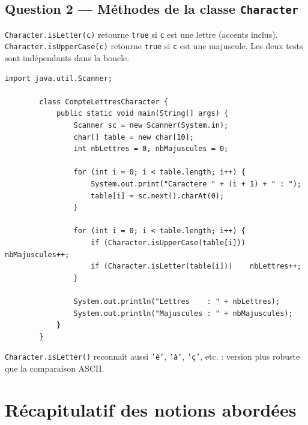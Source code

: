 \documentclass[12pt,a4paper]{article}
\begin{document}
	\subsection*{Question 2 — Méthodes de la classe \texttt{Character}}
	
	\begin{boiteRaisonnement}
		\texttt{Character.isLetter(c)} retourne \texttt{true} si \texttt{c} est une lettre
		(accents inclus). \texttt{Character.isUpperCase(c)} retourne \texttt{true} si
		\texttt{c} est une majuscule. Les deux tests sont indépendants dans la boucle.
	\end{boiteRaisonnement}
	
	\begin{lstlisting}[style=java, caption={Q2 — Comptage avec Character}]
		import java.util.Scanner;
		
		class CompteLettresCharacter {
			public static void main(String[] args) {
				Scanner sc = new Scanner(System.in);
				char[] table = new char[10];
				int nbLettres = 0, nbMajuscules = 0;
				
				for (int i = 0; i < table.length; i++) {
					System.out.print("Caractere " + (i + 1) + " : ");
					table[i] = sc.next().charAt(0);
				}
				
				for (int i = 0; i < table.length; i++) {
					if (Character.isUpperCase(table[i])) nbMajuscules++;
					if (Character.isLetter(table[i]))    nbLettres++;
				}
				
				System.out.println("Lettres    : " + nbLettres);
				System.out.println("Majuscules : " + nbMajuscules);
			}
		}
	\end{lstlisting}
	
	\begin{boiteResultat}
		\texttt{Character.isLetter()} reconnaît aussi \texttt{'é'}, \texttt{'à'},
		\texttt{'ç'}, etc. : version plus robuste que la comparaison ASCII.
	\end{boiteResultat}
	
	\newpage
	\section*{Récapitulatif des notions abordées}
	
\end{document}
